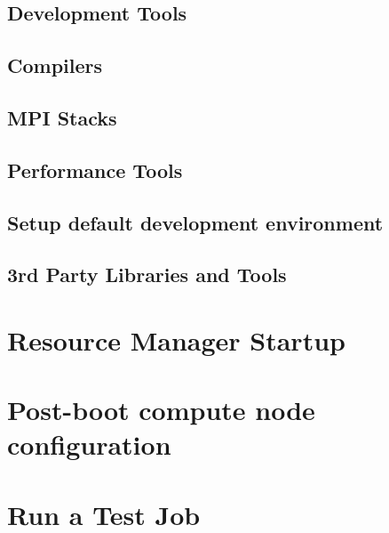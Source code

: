 \documentclass{ohpc-doc}
\begin{document}
\section{Development Tools} \label{sec:install_dev_tools}


\section{Compilers} \label{sec:install_compilers}


\section{MPI Stacks} \label{sec:mpi}


\section{Performance Tools} \label{sec:install_perf_tools}


\section{Setup default development environment}


\section{3rd Party Libraries and Tools} \label{sec:3rdparty}





%

\chapter{Resource Manager Startup} \label{sec:rms_startup}


\chapter{Post-boot compute node configuration} \label{sec:post_boot}


\chapter{Run a Test Job} \label{sec:test_job}


\appendix







\end{document}
